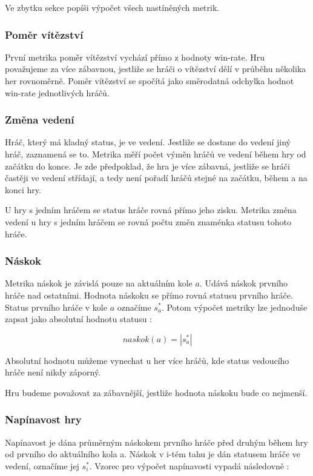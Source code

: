 Ve zbytku sekce popíši výpočet všech nastíněných metrik.

\subsubsection{Poměr vítězství}

První metrika poměr vítězství vychází přímo z hodnoty win-rate. Hru považujeme za více zábavnou, jestliže se hráči o vítězství dělí v průběhu několika her rovnoměrně. Poměr vítězství se spočítá jako směrodatná odchylka hodnot win-rate jednotlivých hráčů.

\subsubsection{Změna vedení}

Hráč, který má kladný status, je ve vedení. Jestliže se dostane do vedení jiný hráč, zaznamená se to. Metrika měří počet výměn hráčů ve vedení během hry od začátku do konce. Je zde předpoklad, že hra je více zábavná, jestliže se hráči častěji ve vedení střídají, a tedy není pořadí hráčů stejné na začátku, během a na konci hry. 

U hry s jedním hráčem se status hráče rovná přímo jeho zisku. Metrika změna vedení u hry s jedním hráčem se rovná počtu změn znaménka statusu tohoto hráče.

\subsubsection{Náskok}

Metrika náskok je závislá pouze na aktuálním kole $a$. Udává náskok prvního hráče nad ostatními. Hodnota náskoku se přímo rovná statusu prvního hráče. Status prvního hráče v kole $a$ označíme $s^*_a$. Potom výpočet metriky lze jednoduše zapsat jako absolutní hodnotu statusu :

	\[
	naskok(a) = |s^*_a|
\]

Absolutní hodnotu můžeme vynechat u her více hráčů, kde status vedoucího hráče není nikdy záporný.

Hru budeme považovat za zábavnější, jestliže hodnota náskoku bude co nejmenší.

\subsubsection{Napínavost hry}
Napínavost je dána průměrným náskokem prvního hráče před druhým během hry od prvního do aktuálního kola a. Náskok v i-tém tahu je dán statusem hráče ve vedení, označíme jej $s^*_i$. Vzorec pro výpočet napínavosti vypadá následovně :

